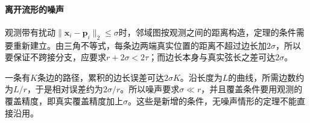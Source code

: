 \paragraph{离开流形的噪声}

观测带有扰动$\lVert\bm x_i-\bm p_i\rVert_2\leq\sigma$时，邻域图按观测之间的距离构造，定理的条件需要重新建立。由三角不等式，每条边两端真实位置的距离不超过边长加$2\sigma$，所以要保证不跨接分支，应要求$r+2\sigma<2\tau$；而边长本身与真实弦长之差可达$2\sigma$。

一条有$K$条边的路径，累积的边长误差可达$2\sigma K$。沿长度为$L$的曲线，所需边数约为$L/r$，于是相对误差约为$2\sigma/r$。所以噪声要求$\sigma\ll r$，并且覆盖条件要用观测的覆盖精度，即真实覆盖精度加上$\sigma$。这些是新增的条件，无噪声情形的定理不能直接沿用。
